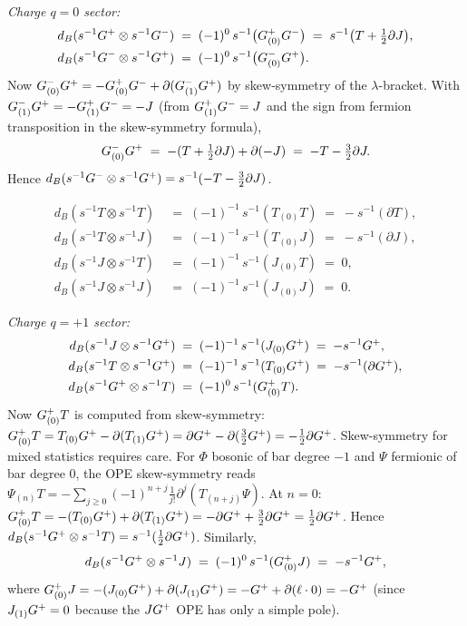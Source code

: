 \begin{computation}
\smallskip
\noindent\emph{Charge $q=0$ sector:}
\begin{align}
d_B(s^{-1}G^+\otimes s^{-1}G^-)
&\;=\;(-1)^0\,s^{-1}\bigl(G^+_{(0)}G^-\bigr)
\;=\;s^{-1}\bigl(T+\tfrac12\partial J\bigr),
\label{eq:dB-GpGm}\\
d_B(s^{-1}G^-\otimes s^{-1}G^+)
&\;=\;(-1)^0\,s^{-1}\bigl(G^-_{(0)}G^+\bigr).
\label{eq:dB-GmGp}
\end{align}
Now $G^-_{(0)}G^+ = -G^+_{(0)}G^- + \partial(G^-_{(1)}G^+)$
by skew-symmetry of the $\lambda$-bracket. With
$G^-_{(1)}G^+ = -G^+_{(1)}G^- = -J$
(from $G^+_{(1)}G^- = J$ and the sign from fermion
transposition in the skew-symmetry formula),
\begin{equation}\label{eq:Gm0Gp}
G^-_{(0)}G^+
\;=\;-(T+\tfrac12\partial J) + \partial(-J)
\;=\;-T-\tfrac32\partial J.
\end{equation}
Hence
$d_B(s^{-1}G^-\otimes s^{-1}G^+)
= s^{-1}(-T - \tfrac32\partial J)$.

\begin{align}
d_B(s^{-1}T\otimes s^{-1}T)
&\;=\;(-1)^{-1}\,s^{-1}(T_{(0)}T)
\;=\;-s^{-1}(\partial T),\label{eq:dB-TT}\\
d_B(s^{-1}T\otimes s^{-1}J)
&\;=\;(-1)^{-1}\,s^{-1}(T_{(0)}J)
\;=\;-s^{-1}(\partial J),\label{eq:dB-TJ}\\
d_B(s^{-1}J\otimes s^{-1}T)
&\;=\;(-1)^{-1}\,s^{-1}(J_{(0)}T)
\;=\;0,\label{eq:dB-JT}\\
d_B(s^{-1}J\otimes s^{-1}J)
&\;=\;(-1)^{-1}\,s^{-1}(J_{(0)}J)
\;=\;0.\label{eq:dB-JJ}
\end{align}

\smallskip
\noindent\emph{Charge $q=+1$ sector:}
\begin{align}
d_B(s^{-1}J\otimes s^{-1}G^+)
&\;=\;(-1)^{-1}\,s^{-1}(J_{(0)}G^+)
\;=\;-s^{-1}G^+,\label{eq:dB-JGp}\\
d_B(s^{-1}T\otimes s^{-1}G^+)
&\;=\;(-1)^{-1}\,s^{-1}(T_{(0)}G^+)
\;=\;-s^{-1}(\partial G^+),\label{eq:dB-TGp}\\
d_B(s^{-1}G^+\otimes s^{-1}T)
&\;=\;(-1)^{0}\,s^{-1}(G^+_{(0)}T).
\label{eq:dB-GpT}
\end{align}
Now $G^+_{(0)}T$ is computed from skew-symmetry:
$G^+_{(0)}T = T_{(0)}G^+ - \partial(T_{(1)}G^+)
= \partial G^+ - \partial(\tfrac32G^+) = -\tfrac12\partial G^+$.
Skew-symmetry for mixed statistics requires care.
For $\Phi$ bosonic of bar degree $-1$ and $\Psi$ fermionic
of bar degree $0$, the OPE skew-symmetry reads
$\Psi_{(n)}T = -\sum_{j\ge 0}(-1)^{n+j}\tfrac{1}{j!}
\partial^j(T_{(n+j)}\Psi)$.
At $n=0$:
$G^+_{(0)}T = -(T_{(0)}G^+) + \partial(T_{(1)}G^+)
= -\partial G^+ + \tfrac32\partial G^+ = \tfrac12\partial G^+$.
Hence
$d_B(s^{-1}G^+\otimes s^{-1}T)
= s^{-1}(\tfrac12\partial G^+)$.
Similarly,
\begin{equation}\label{eq:dB-GpJ}
d_B(s^{-1}G^+\otimes s^{-1}J)
\;=\;(-1)^{0}\,s^{-1}(G^+_{(0)}J)
\;=\;-s^{-1}G^+,
\end{equation}
where $G^+_{(0)}J = -(J_{(0)}G^+) + \partial(J_{(1)}G^+)
= -G^+ + \partial(\ell\cdot 0) = -G^+$
(since $J_{(1)}G^+ = 0$ because the $JG^+$ OPE has only
a simple pole).


\end{computation}
